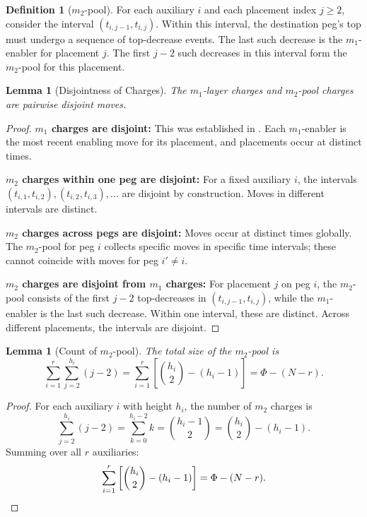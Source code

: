 \documentclass[11pt]{article}
\newtheorem{lemma}[theorem]{Lemma}
\theoremstyle{definition}
\newtheorem{definition}{Definition}
\begin{document}
\begin{definition}[$m_2$-pool]
For each auxiliary $i$ and each placement index $j \geq 2$, consider the interval $(t_{i,j-1}, t_{i,j})$. Within this interval, the destination peg's top must undergo a sequence of top-decrease events. The last such decrease is the $m_1$-enabler for placement $j$. The first $j-2$ such decreases in this interval form the $m_2$-pool for this placement.
\end{definition}

\begin{lemma}[Disjointness of Charges]\label{lem:disjoint-charges}
The $m_1$-layer charges and $m_2$-pool charges are pairwise disjoint moves.
\end{lemma}

\begin{proof}
\textbf{$m_1$ charges are disjoint:} This was established in . Each $m_1$-enabler is the most recent enabling move for its placement, and placements occur at distinct times.

\textbf{$m_2$ charges within one peg are disjoint:} For a fixed auxiliary $i$, the intervals $(t_{i,1}, t_{i,2}), (t_{i,2}, t_{i,3}), \dots$ are disjoint by construction. Moves in different intervals are distinct.

\textbf{$m_2$ charges across pegs are disjoint:} Moves occur at distinct times globally. The $m_2$-pool for peg $i$ collects specific moves in specific time intervals; these cannot coincide with moves for peg $i' \neq i$.

\textbf{$m_2$ charges are disjoint from $m_1$ charges:} For placement $j$ on peg $i$, the $m_2$-pool consists of the first $j-2$ top-decreases in $(t_{i,j-1}, t_{i,j})$, while the $m_1$-enabler is the last such decrease. Within one interval, these are distinct. Across different placements, the intervals are disjoint.
\end{proof}

\begin{lemma}[Count of $m_2$-pool]\label{lem:m2-count}
The total size of the $m_2$-pool is
\[
\sum_{i=1}^{r} \sum_{j=2}^{h_i} (j-2) = \sum_{i=1}^{r} \left[\binom{h_i}{2} - (h_i - 1)\right] = \Phi - (N - r).
\]
\end{lemma}

\begin{proof}
For each auxiliary $i$ with height $h_i$, the number of $m_2$ charges is
\[
\sum_{j=2}^{h_i} (j-2) = \sum_{k=0}^{h_i-2} k = \binom{h_i-1}{2} = \binom{h_i}{2} - (h_i - 1).
\]
Summing over all $r$ auxiliaries:
\[
\sum_{i=1}^{r} \left[\binom{h_i}{2} - (h_i-1)\right] = \Phi - (N - r). \qedhere
\]
\end{proof}
\end{document}
